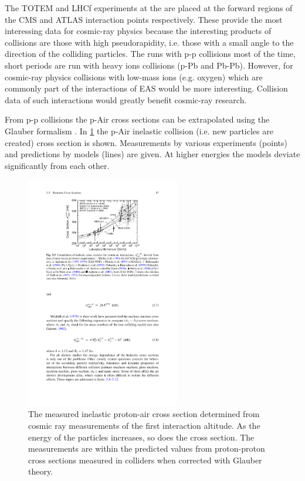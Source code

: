 The TOTEM \cite{antchev2010totem,antchev2011totem} and LHCf \cite{adriani2008lhcf} experiments at the \lhc are placed at the forward regions of the CMS and ATLAS interaction points respectively. These provide the most interessing data for cosmic-ray physics because the interesting products of collisions are those with high pseudorapidity, i.e. those with a small angle to the direction of the colliding particles. The \lhc runs with p-p collisions most of the time, short periods are run with heavy ions collisions (p-Pb and Pb-Pb). However, for cosmic-ray physics collisions with low-mass ions (e.g. oxygen) which are commonly part of the interactions of EAS would be more interesting. Collision data of such interactions would greatly benefit cosmic-ray research.

From p-p collisions the p-Air cross sections can be extrapolated using the Glauber formalism \cite{glauber1955crosssections,abbasi2015crosssection}. In \cref{fig:pair_crosssection} the p-Air inelastic collision (i.e. new particles are created) cross section is shown. Measurements by various experiments (points) and predictions by models (lines) are given. At higher energies the models deviate significantly from each other.

\begin{figure}
    \centering
    \includegraphics[width=0.6\textwidth]
                    {plots/cosmic-rays/pair_crosssection}
    \caption{The measured inelastic proton-air cross section determined from cosmic ray measurements of the first interaction altitude. As the energy of the particles increases, so does the cross section. The measurements are within the predicted values from proton-proton cross sections measured in colliders when corrected with Glauber theory.}
    \label{fig:pair_crosssection}
\end{figure}


